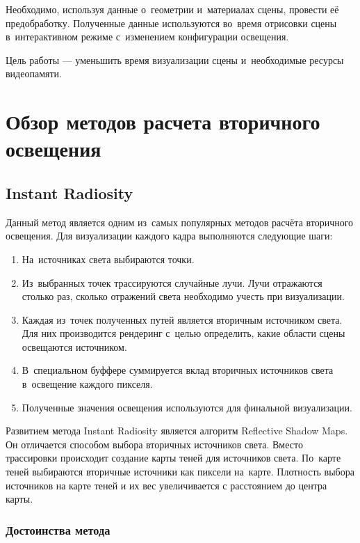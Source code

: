 \documentclass[12pt,fleqn]{article}
\begin{document}
Необходимо, используя данные о~геометрии и~материалах сцены, провести её предобработку. Полученные данные используются во~время отрисовки сцены в~интерактивном режиме с~изменением конфигурации освещения.

Цель работы --- уменьшить время визуализации сцены и~необходимые ресурсы видеопамяти.


\section{Обзор методов расчета вторичного освещения}

\subsection{Instant Radiosity}

Данный метод является одним из~самых популярных методов расчёта вторичного освещения. Для визуализации каждого кадра выполняются следующие шаги:

\begin{enumerate}

\item На~источниках света выбираются точки.

\item Из~выбранных точек трассируются случайные лучи. Лучи отражаются столько раз, сколько отражений света необходимо учесть при визуализации.

\item Каждая из~точек полученных путей является вторичным источником света. Для них производится рендеринг с~целью определить, какие области сцены освещаются источником.

\item В~специальном буффере суммируется вклад вторичных источников света в~освещение каждого пикселя.

\item Полученные значения освещения используются для финальной визуализации.

\end{enumerate}

Развитием метода Instant Radiosity является алгоритм Reflective Shadow Maps. Он отличается способом выбора вторичных источников света. Вместо трассировки происходит создание карты теней для источников света. По~карте теней выбираются вторичные источники как пиксели на~карте. Плотность выбора источников на карте теней и их вес увеличивается с расстоянием до центра карты.

\subsubsection{Достоинства метода}
\end{document}
